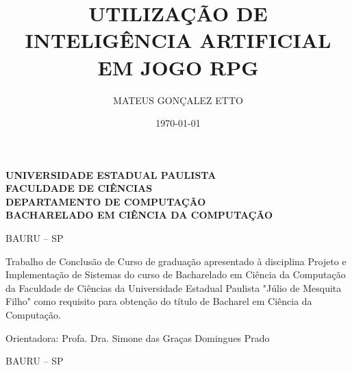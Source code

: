 \documentclass[
	12pt,					%
	openright,				%
	oneside,				%
	a4paper,				%
	bibjustif,				%
	chapter=TITLE,			%
	english,				%
	brazil,					%
	]{abntex2}
\author{MATEUS GONÇALEZ ETTO}
\title{UTILIZAÇÃO DE INTELIGÊNCIA ARTIFICIAL EM JOGO RPG}
\date{\today}
\begin{document}

\thispagestyle{empty} %
\begin{center}
\makeatletter
	\textbf{UNIVERSIDADE ESTADUAL PAULISTA}\\
	\textbf{FACULDADE DE CIÊNCIAS}\\
	\textbf{DEPARTAMENTO DE COMPUTAÇÃO}\\
	\textbf{BACHARELADO EM CIÊNCIA DA COMPUTAÇÃO}\\

	\vspace{4.5cm} %
	\textbf{\@author}

	\vspace{4.5cm} %
	\textbf{\large \@title}
	
	\vspace*{\fill} %
	BAURU – SP\\
	\the\year
\makeatother
\end{center}

\newpage %
\thispagestyle{empty} %
\begin{center}
\makeatletter
	\textbf{\@author}

	\vspace{4.5cm} %
	\textbf{\large \@title}
\makeatother
\end{center}

\begin{adjustwidth}{7cm}{0cm}
	\vspace{1.5cm}
	Trabalho de Conclusão de Curso de graduação apresentado à disciplina Projeto e Implementação de Sistemas do curso de Bacharelado em Ciência da Computação da Faculdade de Ciências da Universidade Estadual Paulista "Júlio de Mesquita Filho"{} como requisito para obtenção do título de Bacharel em Ciência da Computação.
	
	\vspace{1.0cm} %
	\noindent
	Orientadora: Profa. Dra. Simone das Graças Domingues Prado
\end{adjustwidth}

\begin{center}
	\vspace*{\fill} %
	BAURU – SP\\
	\the\year
\end{center}
\end{document}
